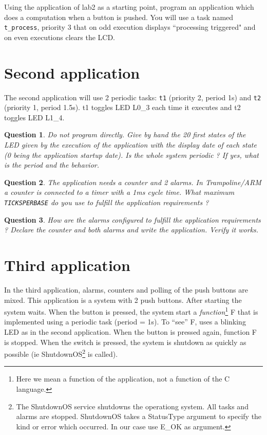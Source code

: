 \documentclass[11pt]{report}
\newtheorem{ex}{Question}
\begin{document}
Using the application of lab2 as a starting point, program an application which does a computation when a button is pushed. You will use a task named \texttt{t_process}, priority 3 that on odd execution displays ``processing triggered" and on even executions clears the LCD.

\section{Second application}

The second application will use 2 periodic tasks: \texttt{t1} (priority 2, period 1s) and \texttt{t2} (priority 1, period 1.5s). t1 toggles LED L0_3 each time it executes and t2 toggles LED L1_4.

\begin{ex}
Do not program directly. Give by hand the 20 first states of the LED given by the execution of the application with the display date of each state (0 being the application startup date). Is the whole system periodic ? If yes, what is the period and the behavior.
\end{ex}

\begin{ex}
The application needs a counter and 2 alarms. In Trampoline/ARM a counter is connected to a timer with a 1ms cycle time. What maximum \texttt{TICKSPERBASE} do you use to fulfill the application requirements ?
\end{ex}

\begin{ex}
How are the alarms configured to fulfill the application requirements ? Declare the counter and both alarms and write the application. Verify it works.
\end{ex}

\section{Third application}

In the third application, alarms, counters and polling of the push buttons are mixed. This application is a system with 2 push buttons. After starting the system waits. When the button is pressed, the system start a {\it function}\footnote{Here we mean a function of the application, not a function of the C language.} F that is implemented using a periodic task (period = 1s). To ``see'' F, uses a blinking LED as in the second application. When the button is pressed again, function F is stopped. When the switch is pressed, the system is shutdown as quickly as possible (ie ShutdownOS\footnote{The ShutdownOS service shutdowns the operationg system. All tasks and alarms are stopped. ShutdownOS takes a StatusType argument to specify the kind or error which occurred. In our case use E_OK as argument.} is called).
\end{document}
